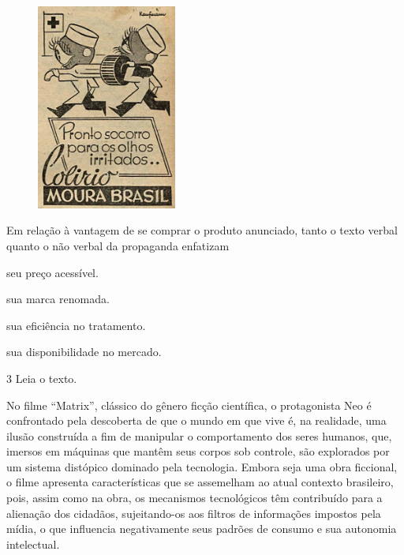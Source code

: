 \begin{minipage}{.5\textwidth}
\begin{figure}[H]
\centering
\includegraphics[height=2.66429in]{./imgSAEB_8_POR/media/image35.png}
\end{figure}
\end{minipage}
\begin{minipage}{.5\textwidth}
Em relação à vantagem de se comprar o produto anunciado, tanto o texto verbal
quanto o não verbal da propaganda enfatizam

\begin{escolha}
\item seu preço acessível.

\item sua marca renomada.

\item sua eficiência no tratamento.

\item sua disponibilidade no mercado.
\end{escolha}
\end{minipage}

\bigskip

\num{3} Leia o texto.

\begin{myquote}
No filme ``Matrix'', clássico do gênero ficção científica, o
protagonista Neo é confrontado pela descoberta de que o mundo em que
vive é, na realidade, uma ilusão construída a fim de manipular o
comportamento dos seres humanos, que, imersos em máquinas que mantêm
seus corpos sob controle, são explorados por um sistema distópico
dominado pela tecnologia. Embora seja uma obra ficcional, o filme
apresenta características que se assemelham ao atual contexto
brasileiro, pois, assim como na obra, os mecanismos tecnológicos têm
contribuído para a alienação dos cidadãos, sujeitando-os aos filtros de
informações impostos pela mídia, o que influencia negativamente seus
padrões de consumo e sua autonomia intelectual.

\end{myquote}

